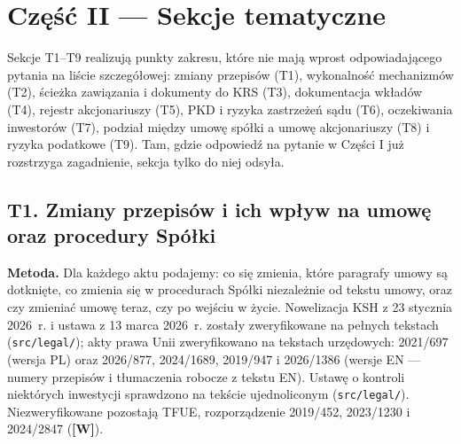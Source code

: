 \documentclass[12pt,a4paper]{report}
\newcounter{paragraf}
\newcommand{\Wiar}[1]{\textbf{[#1]}}
\begin{document}
\clearpage
\chapter*{Część II --- Sekcje tematyczne}

Sekcje T1--T9 realizują punkty zakresu, które nie mają wprost odpowiadającego pytania na liście szczegółowej: zmiany przepisów (T1), wykonalność mechanizmów (T2), ścieżka zawiązania i dokumenty do KRS (T3), dokumentacja wkładów (T4), rejestr akcjonariuszy (T5), PKD i ryzyka zastrzeżeń sądu (T6), oczekiwania inwestorów (T7), podział między umowę spółki a umowę akcjonariuszy (T8) i ryzyka podatkowe (T9). Tam, gdzie odpowiedź na pytanie w Części I już rozstrzyga zagadnienie, sekcja tylko do niej odsyła.

\section*{T1. Zmiany przepisów i ich wpływ na umowę oraz procedury Spółki}

\textbf{Metoda.} Dla każdego aktu podajemy: co się zmienia, które paragrafy umowy są dotknięte, co zmienia się w procedurach Spółki niezależnie od tekstu umowy, oraz czy zmieniać umowę teraz, czy po wejściu w życie. Nowelizacja KSH z 23 stycznia 2026~r. i ustawa z 13 marca 2026~r. zostały zweryfikowane na pełnych tekstach (\texttt{src/legal/}); akty prawa Unii zweryfikowano na tekstach urzędowych: 2021/697 (wersja PL) oraz 2026/877, 2024/1689, 2019/947 i 2026/1386 (wersje EN --- numery przepisów i tłumaczenia robocze z tekstu EN). Ustawę o kontroli niektórych inwestycji sprawdzono na tekście ujednoliconym (\texttt{src/legal/}). Niezweryfikowane pozostają TFUE, rozporządzenie 2019/452, 2023/1230 i 2024/2847 (\Wiar{W}).
\end{document}
